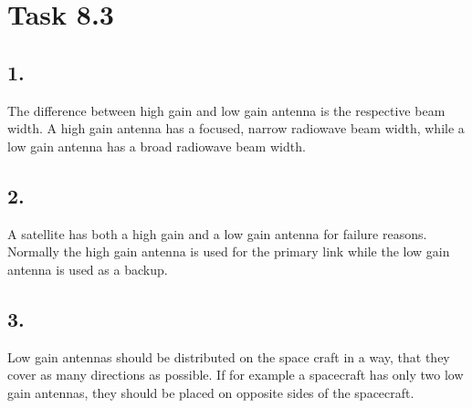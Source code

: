 \documentclass[a4paper,12pt]{article}
\begin{document}
\section*{Task 8.3}
\subsection*{1.}
The difference between high gain and low gain antenna is the respective beam width. A high gain antenna has a focused, narrow radiowave beam
width, while a low gain antenna has a broad radiowave beam width. 
\subsection*{2.}
A satellite has both a high gain and a low gain antenna for failure reasons. Normally the high gain antenna is used for the primary link 
while the low gain antenna is used as a backup.
\subsection*{3.}
Low gain antennas should be distributed on the space craft in a way, that they cover as many directions as possible. If for example a 
spacecraft has only two low gain antennas, they should be placed on opposite sides of the spacecraft. 
\end{document}
